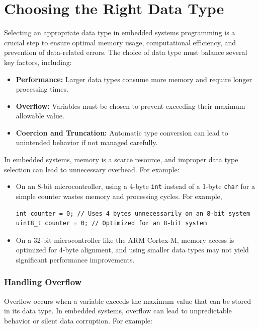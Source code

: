 \documentclass[
  9pt,
  letterpaper,
  abstract,
  titlepage]{scrbook}
\begin{document}
\section{Choosing the Right Data
Type}\label{choosing-the-right-data-type}

Selecting an appropriate data type in embedded systems programming is a
crucial step to ensure optimal memory usage, computational efficiency,
and prevention of data-related errors. The choice of data type must
balance several key factors, including:

\begin{itemize}
\item
  \textbf{Performance:} Larger data types consume more memory and
  require longer processing times.
\item
  \textbf{Overflow:} Variables must be chosen to prevent exceeding their
  maximum allowable value.
\item
  \textbf{Coercion and Truncation:} Automatic type conversion can lead
  to unintended behavior if not managed carefully.
\end{itemize}

In embedded systems, memory is a scarce resource, and improper data type
selection can lead to unnecessary overhead. For example:

\begin{itemize}
\item
  On an 8-bit microcontroller, using a 4-byte \texttt{int} instead of a
  1-byte \texttt{char} for a simple counter wastes memory and processing
  cycles. For example,

\begin{verbatim}
int counter = 0; // Uses 4 bytes unnecessarily on an 8-bit system
uint8_t counter = 0; // Optimized for an 8-bit system
\end{verbatim}
\item
  On a 32-bit microcontroller like the ARM Cortex-M, memory access is
  optimized for 4-byte alignment, and using smaller data types may not
  yield significant performance improvements.
\end{itemize}

\subsubsection{Handling Overflow}\label{handling-overflow}

Overflow occurs when a variable exceeds the maximum value that can be
stored in its data type. In embedded systems, overflow can lead to
unpredictable behavior or silent data corruption. For example:
\end{document}
